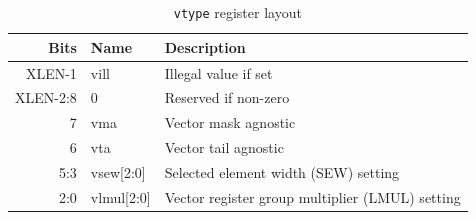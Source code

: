 \documentclass[11pt,a4paper]{article}
\begin{document}
\begin{table}[htbp]
  \centering
  \caption{{\tt vtype} register layout}
  \label{tab:vtype_register_layout}
  \begin{tabular}{rll}
    \toprule
    Bits & Name & Description \\
    \midrule
      XLEN-1 & vill       & Illegal value if set \\
    XLEN-2:8 & 0          & Reserved if non-zero \\
           7 & vma        & Vector mask agnostic \\
           6 & vta        & Vector tail agnostic \\
         5:3 & vsew[2:0]  & Selected element width (SEW) setting \\
         2:0 & vlmul[2:0] & Vector register group multiplier (LMUL) setting \\
    \bottomrule
  \end{tabular}
\end{table}
\end{document}
